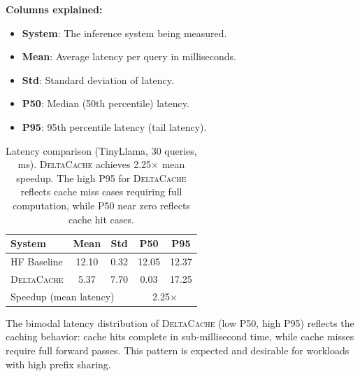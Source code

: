\documentclass{article}
\newcommand{\deltacache}{\textsc{DeltaCache}}
\begin{document}
\textbf{Columns explained:}
\begin{itemize}
    \item \textbf{System}: The inference system being measured.
    \item \textbf{Mean}: Average latency per query in milliseconds.
    \item \textbf{Std}: Standard deviation of latency.
    \item \textbf{P50}: Median (50th percentile) latency.
    \item \textbf{P95}: 95th percentile latency (tail latency).
\end{itemize}

\begin{table}[h]
\centering
\caption{Latency comparison (TinyLlama, 30 queries, ms). \deltacache{} achieves 2.25$\times$ mean speedup. The high P95 for \deltacache{} reflects cache miss cases requiring full computation, while P50 near zero reflects cache hit cases.}
\label{tab:system_comparison}
\begin{tabular}{lcccc}
\toprule
System & Mean & Std & P50 & P95 \\
\midrule
HF Baseline & 12.10 & 0.32 & 12.05 & 12.37 \\
\deltacache{} & 5.37 & 7.70 & 0.03 & 17.25 \\
\midrule
\multicolumn{3}{l}{Speedup (mean latency)} & \multicolumn{2}{c}{2.25$\times$} \\
\bottomrule
\end{tabular}
\end{table}

The bimodal latency distribution of \deltacache{} (low P50, high P95) reflects the caching behavior: cache hits complete in sub-millisecond time, while cache misses require full forward passes. This pattern is expected and desirable for workloads with high prefix sharing.
\end{document}

